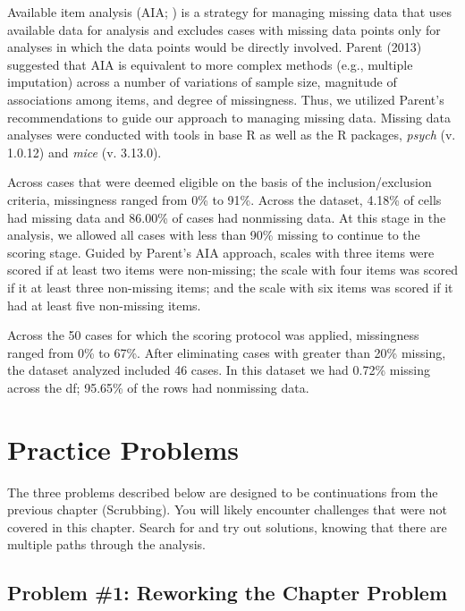 \documentclass[
]{book}
\begin{document}
Available item analysis (AIA; \citep{parent_handling_2013}) is a strategy for managing missing data that uses available data for analysis and excludes cases with missing data points only for analyses in which the data points would be directly involved. Parent (2013) suggested that AIA is equivalent to more complex methods (e.g., multiple imputation) across a number of variations of sample size, magnitude of associations among items, and degree of missingness. Thus, we utilized Parent's recommendations to guide our approach to managing missing data. Missing data analyses were conducted with tools in base R as well as the R packages, \emph{psych} (v. 1.0.12) and \emph{mice} (v. 3.13.0).

Across cases that were deemed eligible on the basis of the inclusion/exclusion criteria, missingness ranged from 0\% to 91\%. Across the dataset, 4.18\% of cells had missing data and 86.00\% of cases had nonmissing data. At this stage in the analysis, we allowed all cases with less than 90\% missing to continue to the scoring stage. Guided by Parent's \citeyearpar{parent_handling_2013} AIA approach, scales with three items were scored if at least two items were non-missing; the scale with four items was scored if it at least three non-missing items; and the scale with six items was scored if it had at least five non-missing items.

Across the 50 cases for which the scoring protocol was applied, missingness ranged from 0\% to 67\%. After eliminating cases with greater than 20\% missing, the dataset analyzed included 46 cases. In this dataset we had 0.72\% missing across the df; 95.65\% of the rows had nonmissing data.

\hypertarget{practice-problems-1}{%
\section{Practice Problems}\label{practice-problems-1}}

The three problems described below are designed to be continuations from the previous chapter (Scrubbing). You will likely encounter challenges that were not covered in this chapter. Search for and try out solutions, knowing that there are multiple paths through the analysis.

\hypertarget{problem-1-reworking-the-chapter-problem}{%
\subsection{Problem \#1: Reworking the Chapter Problem}\label{problem-1-reworking-the-chapter-problem}}
\end{document}
